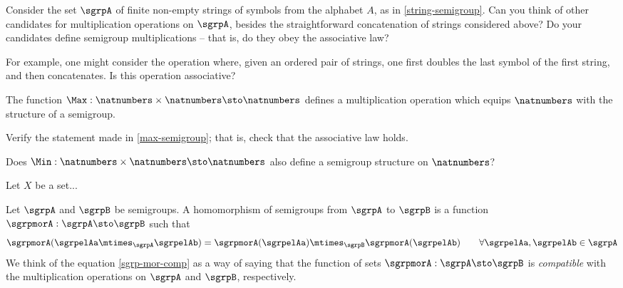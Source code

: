 
\begin{exercise}
Consider the set $\sgrpA$ of finite non-empty strings of symbols from the alphabet $A$, as in \cref{string-semigroup}. Can you think of other candidates for multiplication operations on $\sgrpA$, besides the straightforward concatenation of strings considered above? Do your candidates define semigroup multiplications -- that is, do they obey the associative law?

For example, one might consider the operation where, given an ordered pair of strings, one first doubles the last symbol of the first string, and then concatenates. Is this operation associative?
\end{exercise}
\begin{solution}
\end{solution}


\begin{example}\label{max-semigroup}
The function $\Max : \natnumbers \times \natnumbers \sto \natnumbers$ defines a multiplication operation which equips $\natnumbers$ with the structure of a semigroup.
\end{example}

\begin{exercise}
Verify the statement made in \cref{max-semigroup}; that is, check that the associative law holds.

Does $\Min : \natnumbers \times \natnumbers \sto \natnumbers$ also define a semigroup structure on $\natnumbers$?
\end{exercise}
\begin{solution}
\end{solution}


\begin{example}\label{trafo-semigroup}
Let $X$ be a set... 
\end{example}

\begin{definition}
  \label{def:semigroup-mor}
Let $\sgrpA$ and $\sgrpB$ be semigroups. A homomorphism of semigroups from $\sgrpA$ to $\sgrpB$ is a function $\sgrpmorA: \sgrpA \sto \sgrpB$ such that
\begin{equation}\label{sgrp-mor-comp}
\sgrpmorA(\sgrpelAa \mtimes_{\sgrpA} \sgrpelAb) = \sgrpmorA (\sgrpelAa) \mtimes_{\sgrpB} \sgrpmorA(\sgrpelAb) \quad \quad \forall \sgrpelAa, \sgrpelAb \in \sgrpA
\end{equation}
We think of the equation \cref{sgrp-mor-comp} as a way of saying that the function of sets $\sgrpmorA: \sgrpA \sto \sgrpB$  is \emph{compatible} with the multiplication operations on $\sgrpA$ and $\sgrpB$, respectively.
\end{definition}


